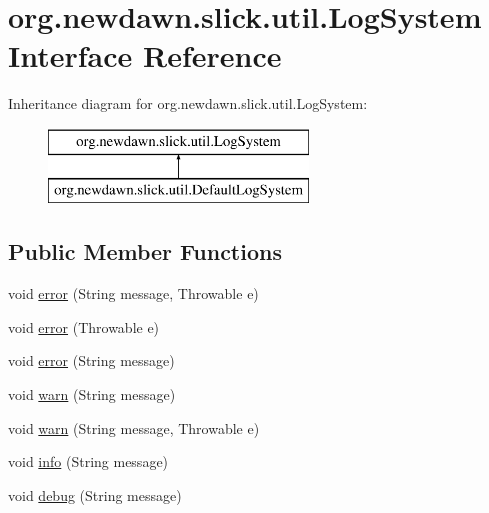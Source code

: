 \hypertarget{interfaceorg_1_1newdawn_1_1slick_1_1util_1_1_log_system}{}\section{org.\+newdawn.\+slick.\+util.\+Log\+System Interface Reference}
\label{interfaceorg_1_1newdawn_1_1slick_1_1util_1_1_log_system}
Inheritance diagram for org.\+newdawn.\+slick.\+util.\+Log\+System\+:\begin{figure}[H]
\begin{center}
\leavevmode
\includegraphics[height=2.000000cm]{interfaceorg_1_1newdawn_1_1slick_1_1util_1_1_log_system}
\end{center}
\end{figure}
\subsection*{Public Member Functions}
\begin{DoxyCompactItemize}
\item 
void \mbox{\hyperlink{interfaceorg_1_1newdawn_1_1slick_1_1util_1_1_log_system_a9ba18920fcc1e6b04324a1b9dfb40640}{error}} (String message, Throwable e)
\item 
void \mbox{\hyperlink{interfaceorg_1_1newdawn_1_1slick_1_1util_1_1_log_system_a0aa3df31981dca33a62896d4f4dbda7b}{error}} (Throwable e)
\item 
void \mbox{\hyperlink{interfaceorg_1_1newdawn_1_1slick_1_1util_1_1_log_system_a5ac24f5df1c272d98f386698f6b8ba2a}{error}} (String message)
\item 
void \mbox{\hyperlink{interfaceorg_1_1newdawn_1_1slick_1_1util_1_1_log_system_a4c4f5a96667389bbca64c86f63272b7d}{warn}} (String message)
\item 
void \mbox{\hyperlink{interfaceorg_1_1newdawn_1_1slick_1_1util_1_1_log_system_a21c1d0fd6928a9973d9727b521bf9352}{warn}} (String message, Throwable e)
\item 
void \mbox{\hyperlink{interfaceorg_1_1newdawn_1_1slick_1_1util_1_1_log_system_a8430f000d206c109e47bea6a30b93be7}{info}} (String message)
\item 
void \mbox{\hyperlink{interfaceorg_1_1newdawn_1_1slick_1_1util_1_1_log_system_af8c0140f915bdebab6ac9062e9fea015}{debug}} (String message)
\end{DoxyCompactItemize}


